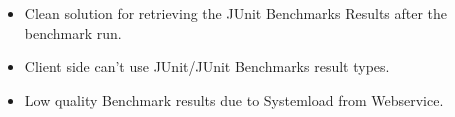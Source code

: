 \begin{itemize}
    \item Clean solution for retrieving the JUnit Benchmarks Results after the benchmark run.
    \item Client side can't use JUnit/JUnit Benchmarks result types.
    \item Low quality Benchmark results due to Systemload from Webservice.
\end{itemize}